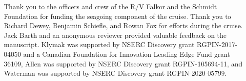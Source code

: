 \documentclass[draft]{agujournal2019}
\begin{document}
\acknowledgments

Thank you to the officers and crew of the R/V Falkor and the Schmidt Foundation for funding the seagoing component of the cruise.  Thank you to Richard Dewey, Benjamin Schiefle, and Rowan Fox for efforts during the cruise.  Jack Barth and an anonymous reviewer provided valuable feedback on the manuscript.  Klymak was supported by NSERC Discovery grant RGPIN-2017-04050 and a Canadian Foundation for Innovation Leading Edge Fund grant 36109, Allen was supported by NSERC Discovery grant RGPIN-105694-11, and Waterman was supported by NSERC Discovery grant RGPIN-2020-05799.


\end{document}
